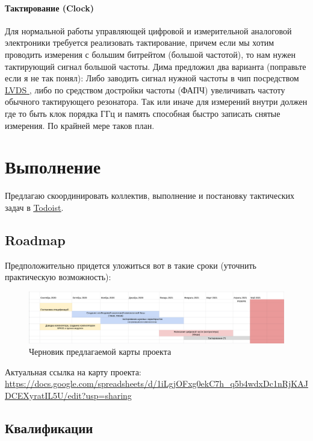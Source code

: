 \documentclass[a4paper,12pt]{article} %
\newcommand{\link}[2]{\underline{\href{#1}{#2} }}
\begin{document}
\paragraph{ Тактирование (Clock)}
Для нормальной работы управляющей цифровой и измерительной аналоговой электроники требуется реализовать тактирование, причем если мы хотим проводить измерения с большим битрейтом (большой частотой), то нам нужен тактирующий сигнал большой частоты. Дима предложил два варианта (поправьте если я не так понял): Либо заводить сигнал нужной частоты в чип посредством \link{https://ru.wikipedia.org/wiki/LVDS}{LVDS}, либо по средством достройки частоты (ФАПЧ) увеличивать частоту обычного тактирующего резонатора. Так или иначе для измерений внутри должен где то быть клок порядка  ГГц и память способная быстро записать снятые измерения. По крайней мере таков план.


\section{Выполнение}





Предлагаю скоординировать коллектив, выполнение и постановку тактических задач в \underline {\href{todoist.com}{Todoist}}.

\subsection{Roadmap}

Предположительно придется уложиться вот в такие сроки (уточнить практическую возможность):


\begin{figure}[h]
\centering
\includegraphics[width=1.1\textwidth]{roadmap.png}
\caption{ Черновик предлагаемой карты проекта}
\end{figure}

Актуальная ссылка на карту проекта:  \url {https://docs.google.com/spreadsheets/d/1iLgjOFxg0ekC7h_q5b4wdxDc1nRjKAJDCEXyratIL5U/edit?usp=sharing}



\subsection{Квалификации}
\end{document}
